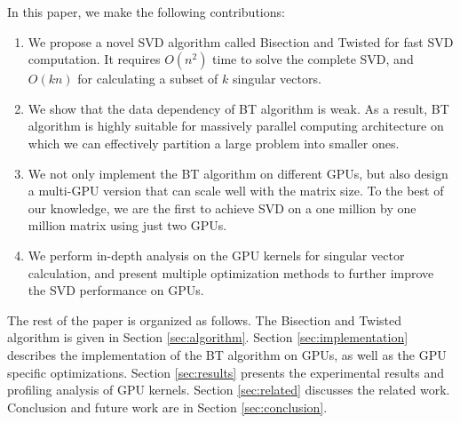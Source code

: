 In this paper, we make the following contributions:
\begin{enumerate}
\item We propose a novel SVD algorithm called Bisection and Twisted for fast SVD computation. It requires $O(n^2)$ time to solve the complete SVD, and $O(kn)$
for calculating a subset of $k$ singular vectors.
\item We show that the data dependency of BT algorithm is weak.
As a result, BT algorithm is highly suitable for massively parallel computing architecture on which we can effectively partition a large problem into smaller ones.
\item We not only implement the BT algorithm on different GPUs, but also design a multi-GPU version that can scale well with the matrix size. To the best of our knowledge, we are the first to achieve SVD on a one million by one million matrix using just two GPUs.
\item We perform in-depth analysis on the GPU kernels for singular vector calculation, and present multiple optimization methods to further improve the SVD performance on GPUs.
\end{enumerate}

The rest of the paper is organized as follows.
The Bisection and Twisted algorithm is given in Section \ref{sec:algorithm}.
Section \ref{sec:implementation} describes the implementation of the BT algorithm on GPUs, as well as the GPU specific optimizations.
Section \ref{sec:results} presents the experimental results and profiling analysis of GPU kernels.
Section \ref{sec:related} discusses the related work.
Conclusion and future work are in Section \ref{sec:conclusion}.

